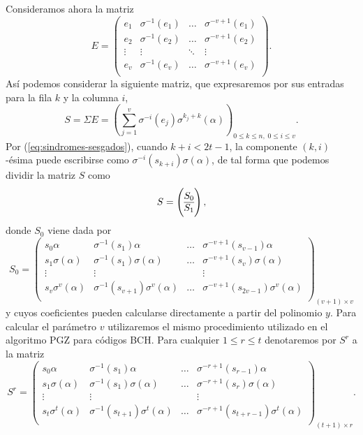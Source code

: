 Consideramos ahora la matriz 
\[
  E = \begin{pmatrix}
    e_1 & \sigma^{-1}(e_1) & \dots & \sigma^{-v + 1}(e_1)\\
    e_2 & \sigma^{-1}(e_2) & \dots & \sigma^{-v + 1}(e_2)\\
    \vdots & \vdots & \ddots & \vdots \\
    e_v & \sigma^{-1}(e_v) & \dots & \sigma^{-v + 1}(e_v)\\
  \end{pmatrix}.
\]
Así podemos considerar la siguiente matriz, que expresaremos por sus entradas para la fila \(k\) y la columna \(i\),
\[
  S = \Sigma E = \left(\sum_{j=1}^v \sigma^{-i}(e_j)\sigma^{k_j+k}(\alpha)\right)_{0 \leq k \leq n,\; 0 \leq i \leq v}.
\]
Por (\ref{eq:sindromes-sesgados}), cuando \(k + i < 2t - 1\), la componente \((k, i)\)-ésima puede escribirse como \(\sigma^{-i}(s_{k+i})\sigma(\alpha)\), de tal forma que podemos dividir la matriz \(S\) como
\[
  S = \left( \begin{array}{@{}c@{}}
    S_0\\\hline
    S_1
  \end{array}\right),
\]
donde \(S_0\) viene dada por
\[
  S_0 = \begin{pmatrix}
    s_0\alpha & \sigma^{-1}(s_1)\alpha & \dots & \sigma^{-v+1}(s_{v-1})\alpha\\
    s_1\sigma(\alpha) & \sigma^{-1}(s_1)\sigma(\alpha) & \dots & \sigma^{-v+1}(s_{v})\sigma(\alpha)\\
    \vdots & \vdots & & \vdots \\
    s_v\sigma^v(\alpha) & \sigma^{-1}(s_{v+1})\sigma^v(\alpha) & \dots & \sigma^{-v+1}(s_{2v-1})\sigma^v(\alpha)\\
  \end{pmatrix}_{(v + 1) \times v}
\]
y cuyos coeficientes pueden calcularse directamente a partir del polinomio \(y\).
Para calcular el parámetro \(v\) utilizaremos el mismo procedimiento utilizado en el algoritmo PGZ para códigos BCH.
Para cualquier \(1 \leq r \leq t\) denotaremos por \(S^r\) a la matriz
\[
  S^r = \begin{pmatrix}
    s_0\alpha & \sigma^{-1}(s_1)\alpha & \dots & \sigma^{-r+1}(s_{r-1})\alpha\\
    s_1\sigma(\alpha) & \sigma^{-1}(s_1)\sigma(\alpha) & \dots & \sigma^{-r+1}(s_{r})\sigma(\alpha)\\
    \vdots & \vdots & & \vdots \\
    s_t\sigma^t(\alpha) & \sigma^{-1}(s_{t+1})\sigma^t(\alpha) & \dots & \sigma^{-r+1}(s_{t+r-1})\sigma^t(\alpha)\\
  \end{pmatrix}_{(t + 1) \times r}.
\]
